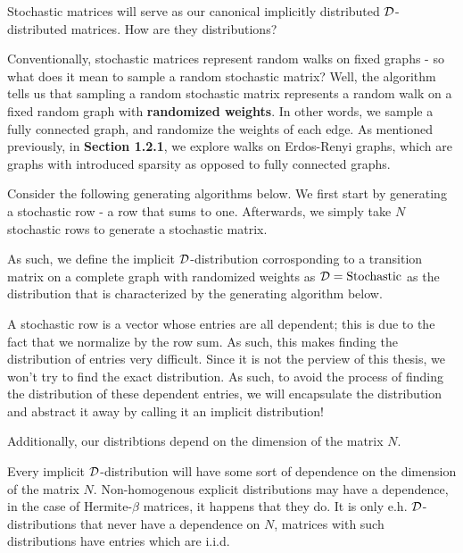 
Stochastic matrices will serve as our canonical implicitly distributed $\mathcal{D}$-distributed matrices. How are they distributions?

Conventionally, stochastic matrices represent random walks on fixed graphs - so what does it mean to sample a random stochastic matrix?
Well, the algorithm tells us that sampling a random stochastic matrix represents a random walk on a fixed random graph with \textbf{randomized weights}.
In other words, we sample a fully connected graph, and randomize the weights of each edge. As mentioned previously, in \textbf{Section 1.2.1}, we explore walks on Erdos-Renyi graphs,
which are graphs with introduced sparsity as opposed to fully connected graphs.

Consider the following generating algorithms below. We first start by generating a stochastic row - a row that sums to one. Afterwards, we simply take $N$ stochastic rows to generate a stochastic matrix.

\ALGstochrow

As such, we define the implicit $\mathcal{D}$-distribution corrosponding to a transition matrix on a complete graph with randomized weights as $\mathcal{D} = \text{Stochastic}$ as the distribution that
is characterized by the generating algorithm below. 

\ALGstoch

\begin{remark}
A stochastic row is a vector whose entries are all dependent; this is due to the fact that we normalize by the row sum.
As such, this makes finding the distribution of entries very difficult. Since it is not the perview of this thesis, we won't try to find the exact distribution.
As such, to avoid the process of finding the distribution of these dependent entries, we will encapsulate the distribution and abstract it away by calling it an implicit distribution!
\end{remark}

Additionally, our distribtions depend on the dimension of the matrix $N$.

\begin{remark}[Dependence on $N$]
Every implicit $\mathcal{D}$-distribution will have some sort of dependence on the dimension of the matrix $N$.
Non-homogenous explicit distributions may have a dependence, in the case of Hermite-$\beta$ matrices, it happens that they do.
It is only e.h. $\mathcal{D}$-distributions that never have a dependence on $N$, matrices with such distributions have entries which are i.i.d.
\end{remark}

